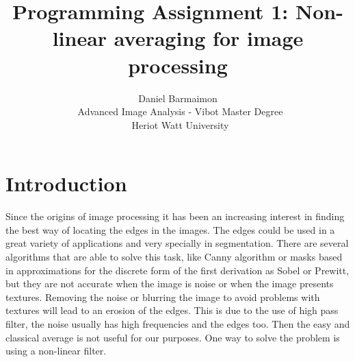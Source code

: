 \documentclass[a4paper, 10pt, conference] {article}
\begin{document}
\date{}
\title{\LARGE \bf
Programming Assignment 1: Non-linear averaging for image processing
}

\author{ \parbox{5 in}{\centering Daniel Barmaimon \\
         \ Advanced Image Analysis - Vibot Master Degree\\
         \ Heriot Watt University\\         
}}

\maketitle









\section{Introduction}
Since the origins of image processing it has been an increasing interest in finding the best way of locating the edges in the images. The edges could be used in a great variety of applications and very specially in segmentation. There are several algorithms that are able to solve this task, like Canny algorithm or masks based in approximations for the discrete form of the first derivation as Sobel or Prewitt, but they are not accurate when the image is noise or when the image presents textures. Removing the noise or blurring the image to avoid problems with textures will lead to an erosion of the edges. This is due to the use of high pass filter, the noise usually has high frequencies and the edges too. Then the easy and classical average is not useful for our purposes. One way to solve the problem is using a non-linear filter. 
\end{document}
